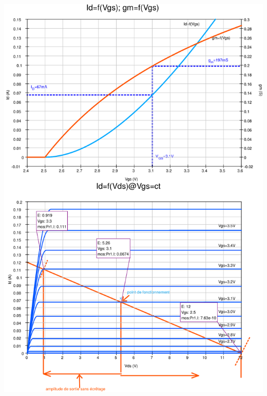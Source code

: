 \documentclass{../template/tp}
\begin{document}
\begin{center}
{\includegraphics[width=15cm]{carac_mos_2k16_corr-crop.pdf}\vspace*{-5cm}}%

\end{center}
\end{document}
